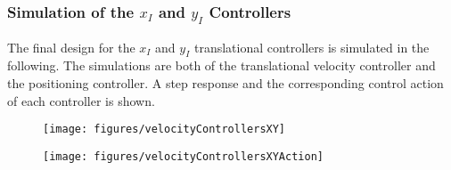 \subsubsection{Simulation of the $x_I$ and $y_I$ Controllers}
The final design for the $x_I$ and $y_I$ translational controllers is simulated in the following. The simulations are both of the translational velocity controller and the positioning controller. A step response and the corresponding control action of each controller is shown.
%
\begin{minipage}{\linewidth}
    \begin{minipage}{0.5\linewidth}
        \begin{figure}[H]
            \texttt{[image: figures/velocityControllersXY]}
            \centering			
            \label{fig:velocityControllersXY}
        \end{figure}
    \end{minipage}
    \hspace{0.03\linewidth}
    \begin{minipage}{0.5\linewidth}
        \begin{figure}[H]
            \texttt{[image: figures/velocityControllersXYAction]}
            \centering
            \label{fig:velocityControllersXYAction}
        \end{figure}
    \end{minipage}
\end{minipage}
%



